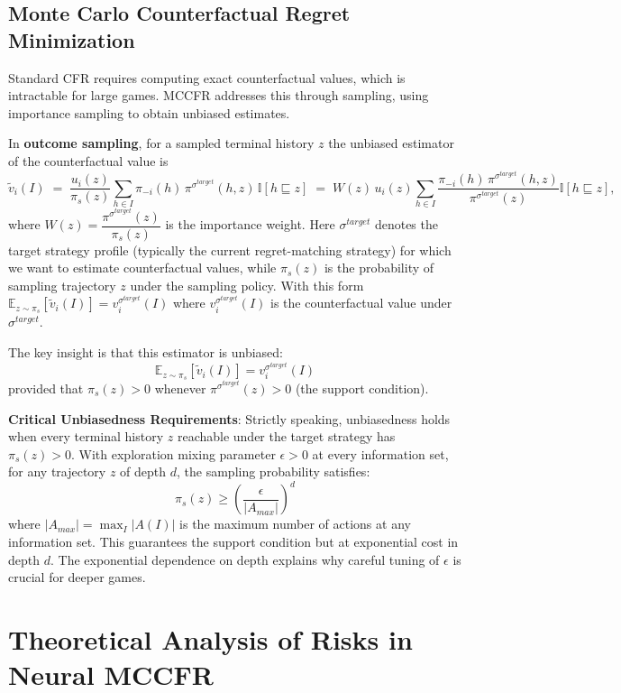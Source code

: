 \documentclass[12pt,a4paper]{article}
\begin{document}
\subsection{Monte Carlo Counterfactual Regret Minimization}

Standard CFR requires computing exact counterfactual values, which is intractable for large games. MCCFR addresses this through sampling, using importance sampling to obtain unbiased estimates.

In \textbf{outcome sampling}, for a sampled terminal history $z$ the unbiased estimator of the counterfactual value is
\[
\tilde{v}_i(I) \;=\; \frac{u_i(z)}{\pi_s(z)} \sum_{h \in I} \pi_{-i}(h)\,\pi^{\sigma^{target}}(h,z)\,\mathbb{I}[h \sqsubseteq z]
\;=\; W(z)\,u_i(z)\sum_{h\in I}\frac{\pi_{-i}(h)\,\pi^{\sigma^{target}}(h,z)}{\pi^{\sigma^{target}}(z)}\mathbb{I}[h\sqsubseteq z],
\]
where $W(z)=\dfrac{\pi^{\sigma^{target}}(z)}{\pi_s(z)}$ is the importance weight. Here $\sigma^{target}$ denotes the target strategy profile (typically the current regret-matching strategy) for which we want to estimate counterfactual values, while $\pi_s(z)$ is the probability of sampling trajectory $z$ under the sampling policy. With this form
\(\mathbb{E}_{z\sim\pi_s}[\tilde v_i(I)] = v_i^{\sigma^{target}}(I)\) where $v_i^{\sigma^{target}}(I)$ is the counterfactual value under $\sigma^{target}$.

The key insight is that this estimator is unbiased:
$$\mathbb{E}_{z \sim \pi_s}[\tilde{v}_i(I)] = v_i^{\sigma^{target}}(I)$$
provided that $\pi_s(z) > 0$ whenever $\pi^{\sigma^{target}}(z) > 0$ (the support condition).

\textbf{Critical Unbiasedness Requirements}: Strictly speaking, unbiasedness holds when every terminal history $z$ reachable under the target strategy has $\pi_s(z) > 0$. With exploration mixing parameter $\epsilon > 0$ at every information set, for any trajectory $z$ of depth $d$, the sampling probability satisfies:
$$\pi_s(z) \geq \left(\frac{\epsilon}{|A_{max}|}\right)^{d}$$
where $|A_{max}| = \max_I |A(I)|$ is the maximum number of actions at any information set. This guarantees the support condition but at exponential cost in depth $d$. The exponential dependence on depth explains why careful tuning of $\epsilon$ is crucial for deeper games.

\section{Theoretical Analysis of Risks in Neural MCCFR}
\label{sec:theory}
\end{document}
